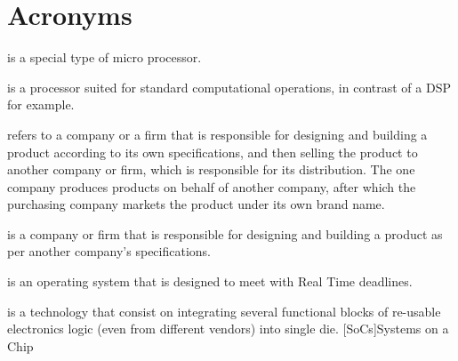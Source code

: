 \chapter{Acronyms}

\begin{acronym}

 is a special type of micro processor.


 is a processor suited for standard computational operations, in contrast of a \ac{DSP} for example.

 refers to a company or a firm that is responsible for designing and building a product according to its own specifications, and then selling the product to another company or firm, which is responsible for its distribution. The one company produces products on behalf of another company, after which the purchasing company markets the product under its own brand name\cite{:uq}.

 is a company or firm that is responsible for designing and building a product as per another company’s specifications\cite{:uq}.



 is an operating system that is designed to meet with Real Time deadlines.

 is a technology that consist on integrating several functional blocks of re-usable electronics logic (even from different vendors) into single die.
[SoCs]{Systems on a Chip}

\end{acronym}

